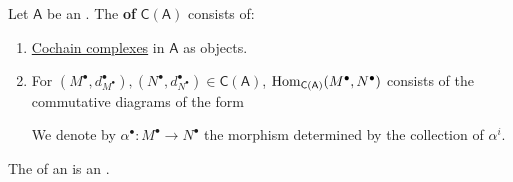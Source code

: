 \documentclass[../main.tex]{subfiles}
\begin{document}
\begin{definition} \label{def:complex-category}
  Let \(\mathsf{A}\) be an .
  The \textbf{ of } \(\mathsf{C}(\mathsf{A})\) consists of:
  \begin{enumerate}
    \item \hyperref[def:complex]{Cochain complexes} in \(\mathsf{A}\) as objects.
    \item For \((M^{\bullet}, d_{M^{\bullet}}^{\bullet}), (N^{\bullet}, d_{N^{\bullet}}^{\bullet}) \in \mathsf{C}(\mathsf{A})\), \(\operatorname{Hom}_{\mathsf{C}(\mathsf{A})}(M^{\bullet}, N^{\bullet})\) consists of the commutative diagrams of the form
          \begin{center}
          \end{center}
          We denote by \(\alpha^{\bullet}: M^{\bullet} \to N^{\bullet}\) the morphism determined by the collection of \(\alpha^{i}\).
  \end{enumerate}
\end{definition}

\begin{lemma}
  The  of an  is an .
\end{lemma}
\end{document}
